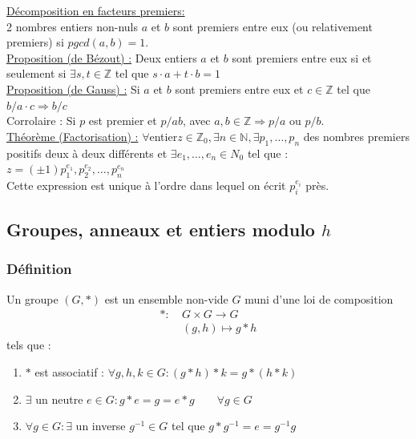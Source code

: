 \documentclass[11pt]{article}
\begin{document}
			\underline{Décomposition en facteurs premiers:}\\
			2 nombres entiers non-nuls $a$ et $b$ sont premiers entre eux (ou relativement premiers) si $pgcd(a, b) = 1$.\\

			\underline{Proposition (de Bézout) :} Deux entiers $a$ et $b$ sont premiers entre eux si et seulement si $\exists s, t \in \mathbb Z$ tel que $s \cdot a + t \cdot b = 1$\\

			\underline{Proposition (de Gauss) :} Si $a$ et $b$ sont premiers entre eux et $c \in \mathbb Z$ tel que $b / a \cdot c \Rightarrow b / c$\\
			Corrolaire : Si $p$ est premier et $p /ab$, avec $a,b \in \mathbb Z \Rightarrow p/a$ ou $p/b$.\\

			\underline{Théorème (Factorisation) :} $\forall $entier$ z \in \mathbb Z_0, \exists n \in \mathbb N, \exists p_1, …, p_n$ des nombres premiers positifs deux à deux différents et $\exists e_1, …, e_n \in N_0$ tel que :\\
			$z = (\pm 1) p_1^{e_1}, p_2^{e_2}, …, p_n^{e_n}$\\
			Cette expression est unique à l'ordre dans lequel on écrit $p_i^{e_i}$ près.
			

	\subsection{Groupes, anneaux et entiers modulo $h$}
		\subsubsection{Définition}
			Un groupe $(G,*)$ est un ensemble non-vide $G$ muni d'une loi de composition 
			\begin{align*}
				* :&\ G \times G \rightarrow G\\
				&\ (g,h) \mapsto g * h
			\end{align*}
			tels que :
			\begin{enumerate}
				\item $*$ est associatif : $\forall g,h,k \in G : (g * h) * k = g * (h * k)$
				\item $\exists$ un neutre $e \in G : g * e = g = e * g \qquad \forall g \in G$
				\item $\forall g \in G : \exists$ un inverse $g^{-1} \in G$ tel que $g * g^{-1} = e = g^{-1}  g$
			\end{enumerate}
\end{document}
